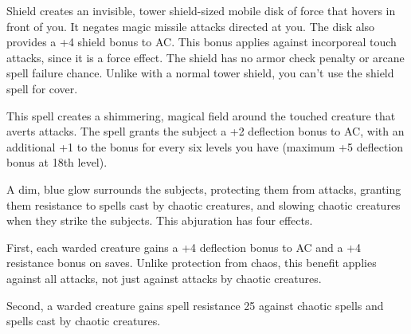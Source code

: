 \begin{multicols}{2}
\begin{small}
\noindent Shield creates an invisible, tower shield-sized mobile disk of force that hovers in front of you. It negates magic missile attacks directed at you. The disk also provides a +4 shield bonus to AC. This bonus applies against incorporeal touch attacks, since it is a force effect. The shield has no armor check penalty or arcane spell failure chance. Unlike with a normal tower shield, you can't use the shield spell for cover.

\noindent This spell creates a shimmering, magical field around the touched creature that averts attacks. The spell grants the subject a +2 deflection bonus to AC, with an additional +1 to the bonus for every six levels you have (maximum +5 deflection bonus at 18th level).


\noindent A dim, blue glow surrounds the subjects, protecting them from attacks, granting them resistance to spells cast by chaotic creatures, and slowing chaotic creatures when they strike the subjects. This abjuration has four effects.

\smallskip\noindent First, each warded creature gains a +4 deflection bonus to AC and a +4 resistance bonus on saves. Unlike protection from chaos, this benefit applies against all attacks, not just against attacks by chaotic creatures.

\smallskip\noindent Second, a warded creature gains spell resistance 25 against chaotic spells and spells cast by chaotic creatures.


\end{small}
\end{multicols}
